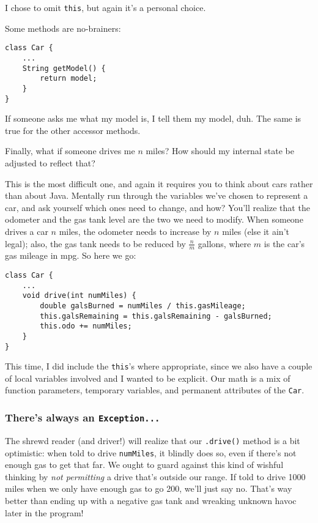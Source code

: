 I chose to omit \texttt{this}, but again it's a personal choice.

Some methods are no-brainers:

\begin{Verbatim}[samepage=true,fontsize=\scriptsize,frame=single]
class Car {
    ...
    String getModel() {
        return model;
    }
}
\end{Verbatim}

If someone asks me what my model is, I tell them my model, duh. The same is
true for the other accessor methods.

Finally, what if someone drives me $n$ miles? How should my internal state
be adjusted to reflect that?

This is the most difficult one, and again it requires you to think about cars
rather than about Java. Mentally run through the variables we've chosen to
represent a car, and ask yourself which ones need to change, and how? You'll
realize that the odometer and the gas tank level are the two we need to
modify. When someone drives a car $n$ miles, the odometer needs to increase by
$n$ miles (else it ain't legal); also, the gas tank needs to be reduced by
$\frac{n}{m}$ gallons, where $m$ is the car's gas mileage in mpg. So here we
go:

\begin{Verbatim}[samepage=true,fontsize=\footnotesize,frame=single]
class Car {
    ...
    void drive(int numMiles) {
        double galsBurned = numMiles / this.gasMileage;
        this.galsRemaining = this.galsRemaining - galsBurned;
        this.odo += numMiles;
    }
}
\end{Verbatim}

This time, I did include the \texttt{this}'s where appropriate, since we also
have a couple of local variables involved and I wanted to be explicit. Our
math is a mix of function parameters, temporary variables, and permanent
attributes of the \texttt{Car}.

\subsubsection{There's always an \texttt{Exception...}}

The shrewd reader (and driver!) will realize that our \texttt{.drive()} method
is a bit optimistic: when told to drive \texttt{numMiles}, it blindly does so,
even if there's not enough gas to get that far. We ought to guard against this
kind of wishful thinking by \textit{not permitting} a drive that's outside our
range. If told to drive 1000 miles when we only have enough gas to go 200,
we'll just say no. That's way better than ending up with a negative gas tank
and wreaking unknown havoc later in the program!


